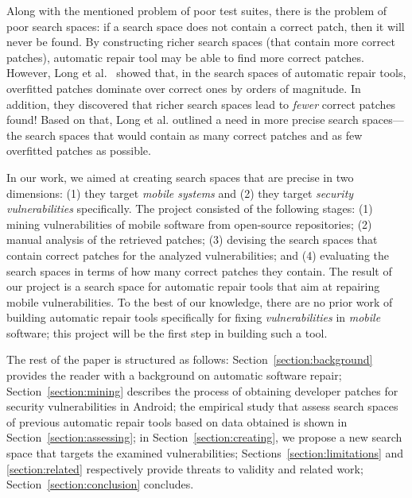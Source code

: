 Along with the mentioned problem of poor test suites, there is the problem of poor search spaces: if a search space does not contain a correct patch, then it will never be found.
By constructing richer search spaces (that contain more correct patches), automatic repair tool may be able to find more correct patches.
However, Long et al.~\cite{long2016analysis} showed that, in the search spaces of \GV automatic repair tools, overfitted patches dominate over correct ones by orders of magnitude.
In addition, they discovered that richer search spaces lead to \emph{fewer} correct patches found!
Based on that, Long et al. outlined a need in more precise search spaces---the search spaces that would contain as many correct patches and as few overfitted patches as possible.

In our work, we aimed at creating search spaces that are precise in two dimensions: (1) they target \emph{mobile systems} and (2) they target \emph{security vulnerabilities} specifically.
The project consisted of the following stages:
(1) mining vulnerabilities of mobile software from open-source repositories;
(2) manual analysis of the retrieved patches;
(3) devising the search spaces that contain correct patches for the analyzed vulnerabilities; and 
(4) evaluating the search spaces in terms of how many correct patches they contain.
The result of our project is a search space for automatic repair tools that aim at repairing mobile vulnerabilities.
To the best of our knowledge, there are no prior work of building \GV automatic repair tools specifically for fixing \emph{vulnerabilities} in \emph{mobile} software; this project will be the first step in building such a tool.

The rest of the paper is structured as follows: Section~\ref{section:background} provides the reader with a background on automatic software repair; Section~\ref{section:mining} describes the process of obtaining developer patches for security vulnerabilities in Android; the empirical study that assess search spaces of previous automatic repair tools based on data obtained is shown in Section~\ref{section:assessing}; in Section~\ref{section:creating}, we propose a new search space that targets the examined vulnerabilities; Sections~\ref{section:limitations} and \ref{section:related} respectively provide threats to validity and related work; Section~\ref{section:conclusion} concludes.
